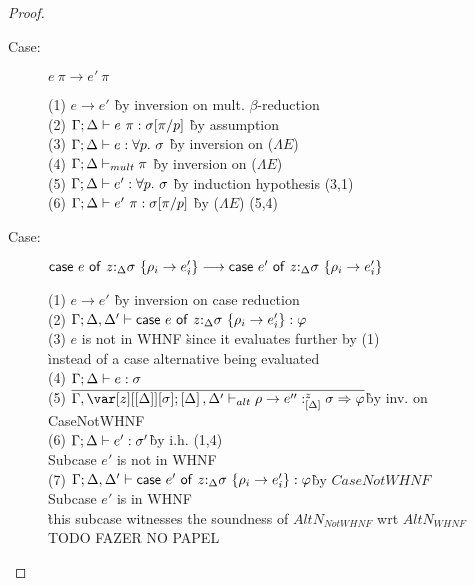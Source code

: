 \begin{proof}
\begin{description}
\item[Case:] $e~\pi \longrightarrow e'~\pi$
\begin{tabbing}
(1) $e \longrightarrow e'$ \` by inversion on mult. $\beta$-reduction \\
(2) $\Gamma; \Delta \vdash e~\pi : \sigma[\pi/p]$ \` by assumption \\
(3) $\Gamma; \Delta \vdash e : \forall p.~\sigma$ \` by inversion on ($\Lambda E$) \\
(4) $\Gamma; \Delta \vdash_{mult} \pi$ \` by inversion on ($\Lambda E$) \\
(5) $\Gamma; \Delta \vdash e' : \forall p.~\sigma$ \` by induction hypothesis (3,1) \\
(6) $\Gamma; \Delta \vdash e'~\pi : \sigma[\pi/p]$ \` by ($\Lambda E$) (5,4) \\
\end{tabbing}

\item[Case:] $\mathsf{case}~e~\mathsf{of}~z{:}_{\Delta}\sigma~\{\rho_i\to e'_i\} \longrightarrow \mathsf{case}~e'~\mathsf{of}~z{:}_{\Delta}\sigma~\{\rho_i\to e'_i\}$
\begin{tabbing}
    (1) $e \longrightarrow e'$ \` by inversion on case reduction \\
    (2) $\Gamma; \Delta, \Delta' \vdash \mathsf{case}~e~\mathsf{of}~z{:}_{\Delta}\sigma~\{\rho_i\to e'_i\} : \varphi$\\
    (3) $e$ is not in WHNF \` since it evaluates further by (1)\\ \` instead of a case alternative being evaluated\\
    (4) $\Gamma;\Delta \vdash e : \sigma$\\
    (5) $\ov{\G,\z[\irr{\D}][\s]; \irr{\D},\D' \vdash_{alt} \rho \to e'' :^z_{\irr{\D}} \s \Rightarrow \vp}$\` by inv. on CaseNotWHNF\\
    (6) $\Gamma;\Delta \vdash e' : \sigma'$\` by i.h. (1,4)\\
    Subcase $e'$ is not in WHNF\\
    (7) $\Gamma; \Delta, \Delta' \vdash \mathsf{case}~e'~\mathsf{of}~z{:}_{\Delta}\sigma~\{\rho_i\to e'_i\} : \varphi$\` by $CaseNotWHNF$\\
    Subcase $e'$ is in WHNF\\
    \` this subcase witnesses the soundness of $AltN_{Not WHNF}$ wrt $AltN_{WHNF}$\\
    TODO FAZER NO PAPEL
\end{tabbing}

\end{description}

\end{proof}

